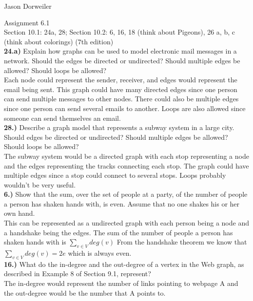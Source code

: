 \documentclass{article}
\begin{document}
Jason Dorweiler

Assignment 6.1\\
 
Section 10.1: 24a, 28; Section 10.2: 6, 16, 18 (think about Pigeons), 26 a, b, c (think about colorings) (7th edition)\\

\textbf{24.a)} Explain how graphs can be used to model electronic mail messages in a network. Should
the edges be directed or undirected? Should multiple edges be allowed? Should loops be
allowed?\\

Each node could represent the sender, receiver, and edges would represent the email being sent.  This graph could have many directed edges since one person can send  multiple messages to other nodes.  There could also be multiple edges since one person can send several emails to another.  Loops are also allowed since someone can send themselves an email. \\


\textbf{28.)} Describe a graph model that represents a subway system in a large city. Should edges
be directed or undirected? Should multiple edges be allowed? Should loops be allowed?  \\

The subway system would be a directed graph with each stop representing a node and the edges representing the tracks connecting each stop.  The graph could have multiple edges since a stop could connect to several stops.  Loops probably wouldn't be very useful. \\

\textbf{6.)} Show that the sum, over the set of people at a party, of the number of people a person
has shaken hands with, is even. Assume that no one shakes his or her own hand.\\

This can be represented as a undirected graph with each person being a node and a handshake being the edges.  The sum of the number of people a person has shaken hands with is $\displaystyle{\sum_{v \in V} deg(v)}$  From the handshake theorem we know that $\displaystyle{\sum_{v \in V} deg(v)} = 2e$  which is always even. \\

\textbf{16.)} What do the in-degree and the out-degree of a vertex in the Web graph, as described in
Example 8 of Section 9.1, represent?\\

The in-degree would represent the number of links pointing to webpage A and the out-degree would be the number that A points to. \\
\end{document}
